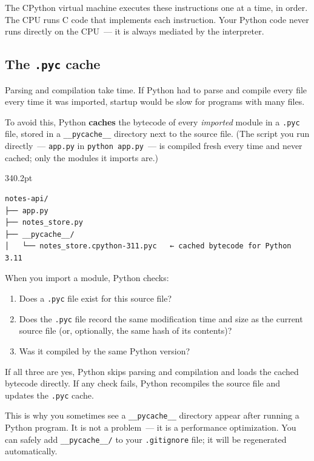 \noindent{}The CPython virtual machine executes these instructions one at a time, in order. The CPU runs C code that implements each instruction. Your Python code never runs directly on the CPU~--- it is always mediated by the interpreter.

\subsection*{\texorpdfstring{The \texttt{.pyc} cache}{The .pyc cache}}\label{02-runtime-initialization:the-pyc-cache}

Parsing and compilation take time. If Python had to parse and compile every file every time it was imported, startup would be slow for programs with many files.

To avoid this, Python \textbf{caches} the bytecode of every \emph{imported} module in a \texttt{.pyc} file, stored in a \texttt{\_\_pycache\_\_} directory next to the source file. (The script you run directly~--- \texttt{app.py} in \texttt{python\ app.py}~--- is compiled fresh every time and never cached; only the modules it imports are.)

\begin{diagrambox}[short]{340.2pt}
\begin{Verbatim}[fontsize=\fontsize{9.0}{8.55}\selectfont]
notes-api/
├── app.py
├── notes_store.py
├── __pycache__/
│   └── notes_store.cpython-311.pyc   ← cached bytecode for Python 3.11
\end{Verbatim}
\end{diagrambox}

\noindent{}When you import a module, Python checks:

\begin{enumerate}
\def\labelenumi{\arabic{enumi}.}
\tightlist
\item
  Does a \texttt{.pyc} file exist for this source file?
\item
  Does the \texttt{.pyc} file record the same modification time and size as the current source file (or, optionally, the same hash of its contents)?
\item
  Was it compiled by the same Python version?
\end{enumerate}

\noindent{}If all three are yes, Python skips parsing and compilation and loads the cached bytecode directly. If any check fails, Python recompiles the source file and updates the \texttt{.pyc} cache.

This is why you sometimes see a \texttt{\_\_pycache\_\_} directory appear after running a Python program. It is not a problem~--- it is a performance optimization. You can safely add \texttt{\_\_pycache\_\_/} to your \texttt{.gitignore} file; it will be regenerated automatically.

